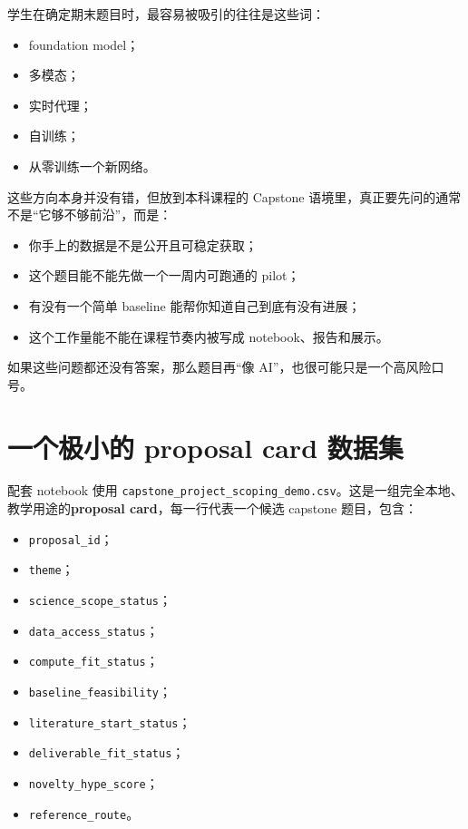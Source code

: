 学生在确定期末题目时，最容易被吸引的往往是这些词：

\begin{itemize}
    \item foundation model；
    \item 多模态；
    \item 实时代理；
    \item 自训练；
    \item 从零训练一个新网络。
\end{itemize}

这些方向本身并没有错，但放到本科课程的 Capstone 语境里，真正要先问的通常不是“它够不够前沿”，而是：

\begin{itemize}
    \item 你手上的数据是不是公开且可稳定获取；
    \item 这个题目能不能先做一个一周内可跑通的 pilot；
    \item 有没有一个简单 baseline 能帮你知道自己到底有没有进展；
    \item 这个工作量能不能在课程节奏内被写成 notebook、报告和展示。
\end{itemize}

如果这些问题都还没有答案，那么题目再“像 AI”，也很可能只是一个高风险口号。

\section{一个极小的 proposal card 数据集}

配套 notebook 使用 \nolinkurl{capstone_project_scoping_demo.csv}。这是一组完全本地、教学用途的\textbf{proposal card}，每一行代表一个候选 capstone 题目，包含：

\begin{itemize}
    \item \texttt{proposal\_id}；
    \item \texttt{theme}；
    \item \texttt{science\_scope\_status}；
    \item \texttt{data\_access\_status}；
    \item \texttt{compute\_fit\_status}；
    \item \texttt{baseline\_feasibility}；
    \item \texttt{literature\_start\_status}；
    \item \texttt{deliverable\_fit\_status}；
    \item \texttt{novelty\_hype\_score}；
    \item \texttt{reference\_route}。
\end{itemize}

